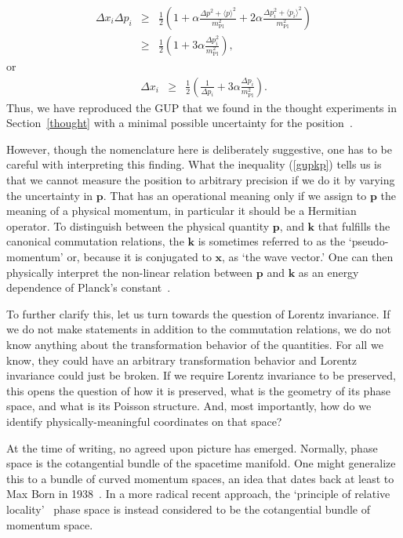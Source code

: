 \documentclass{article}
\def\beqn{\begin{eqnarray}}
\def\eeqn{\end{eqnarray}}
\begin{document}
  \beqn
\Delta x_i \Delta p_i &\geq& \frac{1}{2} \left( 1 + \alpha \frac{\Delta p^2 + \langle p \rangle^2}{m_{\mathrm{Pl}}^2} + 2 \alpha  
\frac{\Delta p_i^2 + \langle p_i \rangle^2}{ m_{\mathrm{Pl}}^2} \right) \nonumber\\
&\geq& 
\frac{1}{2} \left( 1 + 3 \alpha \frac{\Delta p_i^2}{m_{\mathrm{Pl}}^2} \right) ,
\eeqn
or 
\beqn
\Delta x_i &\geq& 
\frac{1}{2} \left( \frac{1}{\Delta p_i} + 3 \alpha \frac{\Delta p_i}{m_{\mathrm{Pl}}^2} \right) . \label{gupkp}
\eeqn
Thus, we have reproduced the GUP that we found in the thought experiments
in Section~\ref{thought} with a minimal possible uncertainty for the position~\cite{Kempf:1993bq,AmelinoCamelia:1999pm,Maggiore:1993kv,Maggiore:1993zu,AmelinoCamelia:1999wk}. 

However, though the nomenclature here is deliberately suggestive, one has to be careful with interpreting this
finding. What the inequality (\ref{gupkp}) tells us is that we cannot measure the position to arbitrary precision if we
do it by varying the uncertainty in $\mathbf{p}$. That has an operational meaning only if we assign to $\mathbf{p}$
the meaning of a physical momentum, in particular it should be a Hermitian operator. 
To distinguish between the physical quantity $\mathbf{p}$, and $\mathbf{k}$ that fulfills the
canonical commutation relations, the $\mathbf{k}$ is sometimes referred to as the `pseudo-momentum' or, because it
is conjugated to $\mathbf{x}$, as `the wave vector.' One can then
physically interpret the non-linear relation between $\mathbf{p}$ and $\mathbf{k}$ as an 
energy dependence of Planck's constant~\cite{Hossenfelder:2006rr}. 

To further clarify this, let us turn towards the question of Lorentz invariance. If we do not make 
statements in addition to the commutation relations, we do not know anything about the transformation behavior of the quantities.
For all we know, they could have an arbitrary transformation behavior and 
Lorentz invariance could just be broken. If we require Lorentz invariance to be preserved, this opens the
question of how it is preserved, what is the geometry of its phase space, and what is its Poisson structure. 
And, most importantly, how do we identify physically-meaningful coordinates on that space?

At the time of writing,
no agreed upon picture has emerged. Normally, phase space is the cotangential bundle of the spacetime
manifold. One might generalize this to a bundle of curved momentum spaces, an idea that dates back
at least to Max Born in 1938~\cite{Born}. In a more radical recent
approach, the `principle of relative locality'~\cite{Smolin:2010xa,Smolin:2010mx,Jacob:2010vr,AmelinoCamelia:2010qv,AmelinoCamelia:2011bm,AmelinoCamelia:2011yi}
phase space is instead considered to be the cotangential bundle of momentum space. 
\end{document}

